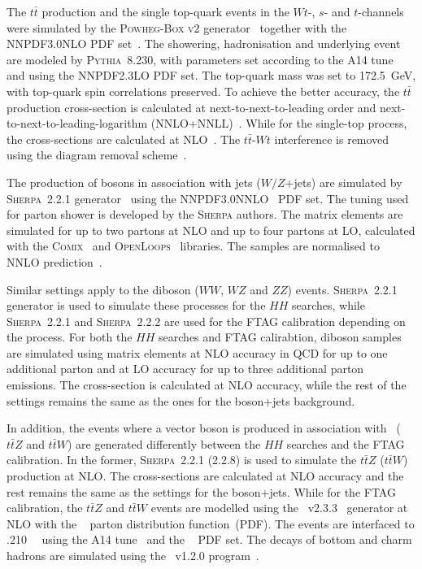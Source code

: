 The $t\bar{t}$ production and the single top-quark events 
in the $Wt$-, $s$- and $t$-channels
were simulated by the \textsc{Powheg-Box v2} generator~
\cite{Frixione:2007nw,Nason:2004rx,Frixione:2007vw,Alioli:2010xd}
together with the \textsc{NNPDF3.0NLO} PDF set~\cite{Ball:2014uwa}.
The showering, hadronisation and underlying event 
are modeled by \textsc{Pythia~8.230},
with parameters set according to the A14 tune~\cite{ATL-PHYS-PUB-2017-007}
and using the \textsc{NNPDF2.3LO} PDF set.
The top-quark mass was set to 172.5~GeV,
with top-quark spin correlations preserved.
To achieve the better accuracy, 
the $t\bar{t}$ production cross-section is calculated
at next-to-next-to-leading order 
and next-to-next-to-leading-logarithm 
(NNLO+NNLL)~\cite{Czakon:2011xx}.
While for the single-top process, 
the cross-sections are calculated at
NLO~\cite{stop_sch_Xsec,stop_tch_Xsec,Kidonakis:2010ux}.
The $t\bar{t}$-$Wt$ interference is removed
using the diagram removal scheme~\cite{Frixione:2008yi}.

The production of bosons in association with jets 
($W/Z$+jets) are simulated by 
\textsc{Sherpa}~2.2.1 generator~\cite{Bothmann:2019yzt}
using the NNPDF3.0NNLO~\cite{Ball:2014uwa} PDF set.
The tuning used for parton shower is developed by the 
\textsc{Sherpa} authors. 
The matrix elements are simulated for up to two partons at
NLO and up to four partons at LO, calculated with the 
\textsc{Comix}~\cite{Gleisberg:2008fv} and 
\textsc{OpenLoops}~\cite{Cascioli:2011va} libraries.
The samples are normalised to NNLO prediction~\cite{Anastasiou:2003ds}.

Similar settings apply to the diboson ($WW$, $WZ$ and $ZZ$) events.
\textsc{Sherpa}~2.2.1 generator is used to simulate these processes
for the $HH$ searches, while \textsc{Sherpa}~2.2.1 and \textsc{Sherpa}~2.2.2
are used for the FTAG calibration depending on the process.
For both the $HH$ searches and FTAG calirabtion, 
diboson samples are simulated using
matrix elements at NLO accuracy in QCD for up to one additional parton
and at LO accuracy for up to three additional parton emissions.
The cross-section is calculated at NLO accuracy, while
the rest of the settings remains the same as the ones for the boson+jets background.

In addition, the events where
a vector boson is produced in association with \ttbar\
($t\bar tZ$ and $t\bar tW$) are generated differently
between the $HH$ searches and the FTAG calibration.
In the former,
\textsc{Sherpa}~2.2.1 (2.2.8) is used to simulate the
$t\bar tZ$ ($t\bar tW$) production at NLO.
The cross-sections are calculated at NLO accuracy and 
the rest remains the same as the settings for the boson+jets. 
While for the FTAG calibration,
the $t\bar tZ$ and $t\bar tW$ events are modelled using the
\mgamc~v2.3.3~\cite{Alwall:2014hca} generator at NLO with the
\nnpdfnlo~\cite{Ball:2014uwa} parton distribution function~(PDF).
The events are interfaced to \pythia.210~\cite{Sjostrand:2014zea}~
using the A14 tune~\cite{ATL-PHYS-PUB-2014-021} and the
\nnpdftwo~\cite{Ball:2014uwa} PDF set. The decays of bottom and charm
hadrons are simulated using the \evtgen\ v1.2.0 program~\cite{Lange:2001uf}.


